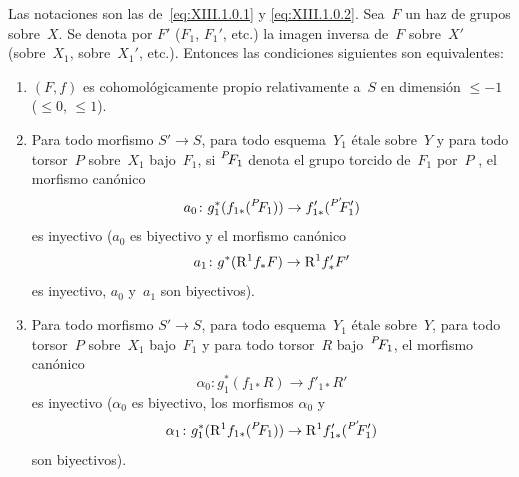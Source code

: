 \begingroup
\setcounter{proposition}{0}%
\renewcommand{\theproposition}{\thesubsection.\arabic{proposition}}
\renewcommand{\theHproposition}{\theHsubsection.\arabic{proposition}}
\begin{subproposition}
\label{XIII.1.3.1}
Las notaciones son las de~\eqref{eq:XIII.1.0.1} y
\eqref{eq:XIII.1.0.2}. Sea~$F$ un haz de grupos sobre~$X$. Se denota por
$F'$ (\resp $F_1$, \resp $F_1'$, etc.) la imagen inversa de~$F$ sobre~$X'$
(\resp sobre~$X_1$, \resp sobre~$X_1'$, etc.). Entonces las condiciones
siguientes son equivalentes:
\begin{enumerate}
\item[(i)] $(F,f)$ es cohomológicamente propio relativamente a~$S$ en
dimensión $\leqslant -1$ (\resp $\leqslant 0$, \resp $\leqslant 1$).
\item[(ii)] Para todo morfismo $S' \to S$, para todo esquema~$Y_1$ étale
sobre~$Y$ y para todo torsor~$P$ sobre~$X_1$ bajo~$F_1$, si
$\leftexp{P\mkern-4mu}{F}_1$ denota el grupo torcido de~$F_1$ por~$P$
\textup{\cite[II 4.1.2.3]{XIII.1}}, el morfismo canónico
$$
a_0 \colon g_1^*(f_{1 *}(\leftexp{P\mkern-4mu}{F}_1)) \to f'_{1
*}(\leftexp{P'\mkern-6mu}{F}'_1)
$$
es inyectivo (\resp $a_0$ es biyectivo y el morfismo canónico
$$
a_1 \colon g^*(\mathrm{R}^1 f_* F) \to \mathrm{R}^1 f'_* F'
$$
es
inyectivo, \resp $a_0$ y~$a_1$ son biyectivos).
\item[(ii~bis)] Para todo morfismo $S' \to S$, para todo esquema~$Y_1$
étale sobre~$Y$, para todo torsor~$P$ sobre~$X_1$ bajo~$F_1$ y para todo
torsor~$R$ bajo~$\leftexp{P\mkern-4mu}{F}_1$, el morfismo canónico
$$
\alpha_0 \colon g_1^*(f_{1 *}R) \to f'_{1 *} R'
$$
es inyectivo (\resp $\alpha_0$ es biyectivo, \resp los morfismos
$\alpha_0$ y
$$
\alpha_1 \colon g_1^*(\R^1 f_{1 *}(\leftexp{P\mkern-4mu}{F}_1)) \to \R^1
f'_{1 *}(\leftexp{P'\mkern-6mu}{F}'_1)
$$
son biyectivos).
\end{enumerate}
\end{subproposition}
\endgroup

